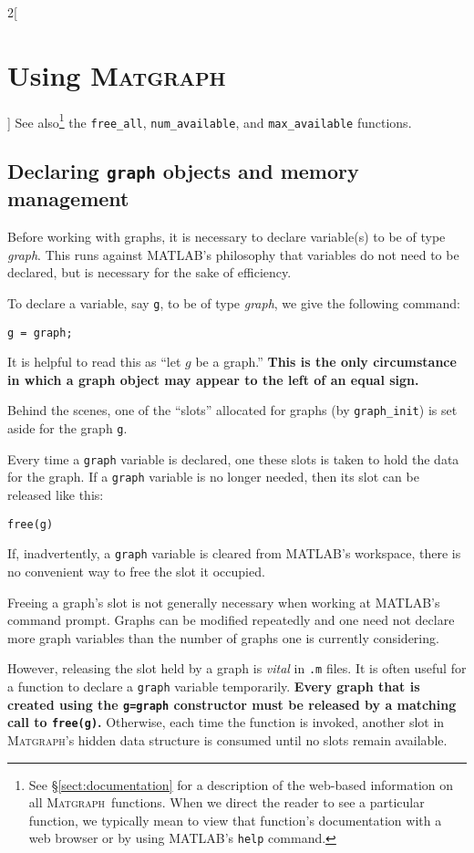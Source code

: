 \documentclass{amsart}
\newcommand\matlab{MATLAB}
\newcommand\matgraph{\textsc{Matgraph}}
\begin{document}
\begin{multicols}{2}[\section{Using \matgraph}]
See also\footnote{See \S\ref{sect:documentation} for a description of
  the web-based information on all \matgraph\ functions. When we
  direct the reader to see a particular function, we typically mean to
  view that function's documentation with a web browser or by using
  \matlab's \texttt{help} command.}  the
\verb|free_all|, \verb|num_available|, and \verb|max_available|
functions.




\subsection{Declaring \texttt{graph} objects and memory management}
\label{subsection:declare}



Before working with graphs, it is necessary to declare variable(s) to
be of type \emph{graph}. This runs against \matlab's philosophy that
variables do not need to be declared, but is necessary for the sake of
efficiency. 

To declare a variable, say \verb|g|, to be of type \emph{graph}, we 
give the following command:
\begin{verbatim}
g = graph;
\end{verbatim}
It is helpful to read this as ``let $g$ be a graph.'' 
\textbf{This is the only circumstance in which a graph object may
  appear to the left of an equal sign.}

Behind the scenes, one of the ``slots'' allocated for graphs (by
\verb|graph_init|) is set aside for the graph \verb|g|.

Every time a \verb|graph| variable is declared, one these slots is
taken to hold the data for the graph. If a \verb|graph| variable is no
longer needed, then its slot can be released like this:
\begin{verbatim}
free(g)
\end{verbatim}
If, inadvertently, a \verb|graph| variable is cleared from \matlab's
workspace, there is no convenient way to free the slot it occupied. 

Freeing a graph's slot is not generally necessary when working at
\matlab's command prompt. Graphs can be modified repeatedly and one
need not declare more graph variables than the number of graphs one is
currently considering. 

However, releasing the slot held by a graph is \emph{vital} in
\verb|.m| files. It is often useful for a function to declare a
\verb|graph| variable temporarily. {\bfseries Every graph that is
  created using the \texttt{g=graph} constructor must be released by
  a matching call to \texttt{free(g)}.} Otherwise, each time the
function is invoked, another slot in \matgraph's hidden data structure
is consumed until no slots remain available.


\end{multicols}
\end{document}
